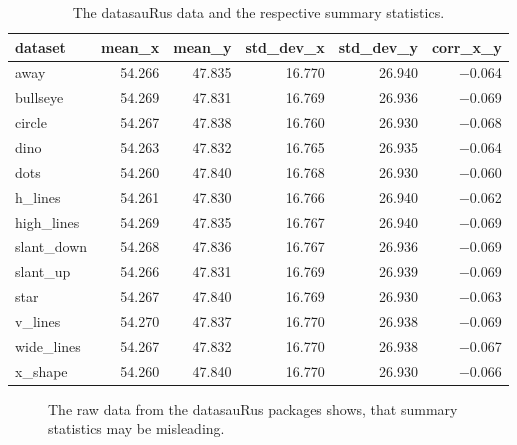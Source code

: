 \documentclass[
  a4paper,
]{scrbook}
\begin{document}
\begin{longtable}[]{@{}lrrrrr@{}}

\caption{\label{tbl-corr-limits}The datasauRus data and the respective
summary statistics.}

\tabularnewline

\toprule\noalign{}
dataset & mean\_x & mean\_y & std\_dev\_x & std\_dev\_y & corr\_x\_y \\
\midrule\noalign{}
\endhead
\bottomrule\noalign{}
\endlastfoot
away & 54.266 & 47.835 & 16.770 & 26.940 & −0.064 \\
bullseye & 54.269 & 47.831 & 16.769 & 26.936 & −0.069 \\
circle & 54.267 & 47.838 & 16.760 & 26.930 & −0.068 \\
dino & 54.263 & 47.832 & 16.765 & 26.935 & −0.064 \\
dots & 54.260 & 47.840 & 16.768 & 26.930 & −0.060 \\
h\_lines & 54.261 & 47.830 & 16.766 & 26.940 & −0.062 \\
high\_lines & 54.269 & 47.835 & 16.767 & 26.940 & −0.069 \\
slant\_down & 54.268 & 47.836 & 16.767 & 26.936 & −0.069 \\
slant\_up & 54.266 & 47.831 & 16.769 & 26.939 & −0.069 \\
star & 54.267 & 47.840 & 16.769 & 26.930 & −0.063 \\
v\_lines & 54.270 & 47.837 & 16.770 & 26.938 & −0.069 \\
wide\_lines & 54.267 & 47.832 & 16.770 & 26.938 & −0.067 \\
x\_shape & 54.260 & 47.840 & 16.770 & 26.930 & −0.066 \\

\end{longtable}

\begin{figure}[ht]


\caption{\label{fig-corr-limits}The raw data from the datasauRus
packages shows, that summary statistics may be misleading.}

\end{figure}%
\end{document}
